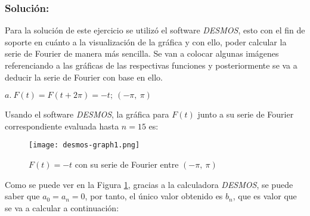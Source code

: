 \begin{multicols}{2}
\subsubsection*{\textbf{Solución:}}

Para la solución de este ejercicio se utilizó el software \textit{DESMOS}, esto con el fin de soporte en cuánto a la visualización de la gráfica y con ello, poder calcular la serie de Fourier de manera más sencilla. Se van a colocar algunas imágenes referenciando a las gráficas de las respectivas funciones y posteriormente se va a deducir la serie de Fourier con base en ello.

$a.~ F(t) = F(t + 2\pi) = -t;~ (-\pi,~\pi)$

Usando el software \textit{DESMOS}, la gráfica para $F(t)$ junto a su serie de Fourier correspondiente evaluada hasta $n=15$ es:

\begin{figure}[H]
\begin{center}
    \texttt{[image: desmos-graph1.png]}
    \caption{$F(t) = -t$ con su serie de Fourier entre $(-\pi,~\pi)$}
    \label{figdes:1} 
\end{center}
\end{figure}

Como se puede ver en la Figura \ref{figdes:1}, gracias a la calculadora \textit{DESMOS}, se puede saber que $a_0 = a_n = 0$, por tanto, el único valor obtenido es $b_n$, que es valor que se va a calcular a continuación:


\end{multicols}
